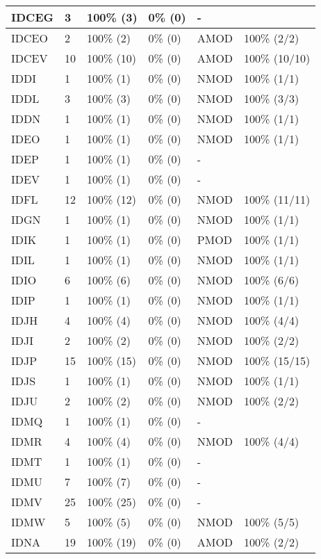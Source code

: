 \begin{figure*}
\begin{tabular}{|l|l|l|l||l|l|}
\hline
 IDCEG & 3 & 100\% (3) & 0\% (0) & - &  \\ 
\hline
 IDCEO & 2 & 100\% (2) & 0\% (0) & AMOD & 100\% (2/2) \\ 
\hline
 IDCEV & 10 & 100\% (10) & 0\% (0) & AMOD & 100\% (10/10) \\ 
\hline
 IDDI & 1 & 100\% (1) & 0\% (0) & NMOD & 100\% (1/1) \\ 
\hline
 IDDL & 3 & 100\% (3) & 0\% (0) & NMOD & 100\% (3/3) \\ 
\hline
 IDDN & 1 & 100\% (1) & 0\% (0) & NMOD & 100\% (1/1) \\ 
\hline
 IDEO & 1 & 100\% (1) & 0\% (0) & NMOD & 100\% (1/1) \\ 
\hline
 IDEP & 1 & 100\% (1) & 0\% (0) & - &  \\ 
\hline
 IDEV & 1 & 100\% (1) & 0\% (0) & - &  \\ 
\hline
 IDFL & 12 & 100\% (12) & 0\% (0) & NMOD & 100\% (11/11) \\ 
\hline
 IDGN & 1 & 100\% (1) & 0\% (0) & NMOD & 100\% (1/1) \\ 
\hline
 IDIK & 1 & 100\% (1) & 0\% (0) & PMOD & 100\% (1/1) \\ 
\hline
 IDIL & 1 & 100\% (1) & 0\% (0) & NMOD & 100\% (1/1) \\ 
\hline
 IDIO & 6 & 100\% (6) & 0\% (0) & NMOD & 100\% (6/6) \\ 
\hline
 IDIP & 1 & 100\% (1) & 0\% (0) & NMOD & 100\% (1/1) \\ 
\hline
 IDJH & 4 & 100\% (4) & 0\% (0) & NMOD & 100\% (4/4) \\ 
\hline
 IDJI & 2 & 100\% (2) & 0\% (0) & NMOD & 100\% (2/2) \\ 
\hline
 IDJP & 15 & 100\% (15) & 0\% (0) & NMOD & 100\% (15/15) \\ 
\hline
 IDJS & 1 & 100\% (1) & 0\% (0) & NMOD & 100\% (1/1) \\ 
\hline
 IDJU & 2 & 100\% (2) & 0\% (0) & NMOD & 100\% (2/2) \\ 
\hline
 IDMQ & 1 & 100\% (1) & 0\% (0) & - &  \\ 
\hline
 IDMR & 4 & 100\% (4) & 0\% (0) & NMOD & 100\% (4/4) \\ 
\hline
 IDMT & 1 & 100\% (1) & 0\% (0) & - &  \\ 
\hline
 IDMU & 7 & 100\% (7) & 0\% (0) & - &  \\ 
\hline
 IDMV & 25 & 100\% (25) & 0\% (0) & - &  \\ 
\hline
 IDMW & 5 & 100\% (5) & 0\% (0) & NMOD & 100\% (5/5) \\ 
\hline
 IDNA & 19 & 100\% (19) & 0\% (0) & AMOD & 100\% (2/2) \\ 
\hline
\end{tabular}
\end{figure*}
